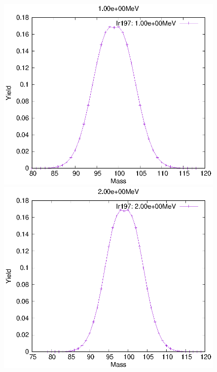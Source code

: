 \begin{figure}[htbp]
 \begin{minipage}{0.33\textwidth} \begin{center} \includegraphics[width=\textwidth]{YA/Ir197_1.00e+00.eps} \end{center} \end{minipage}
\begin{minipage}{0.33\textwidth} \begin{center} \includegraphics[width=\textwidth]{YA/Ir197_2.00e+00.eps} \end{center} \end{minipage}

\end{figure}
